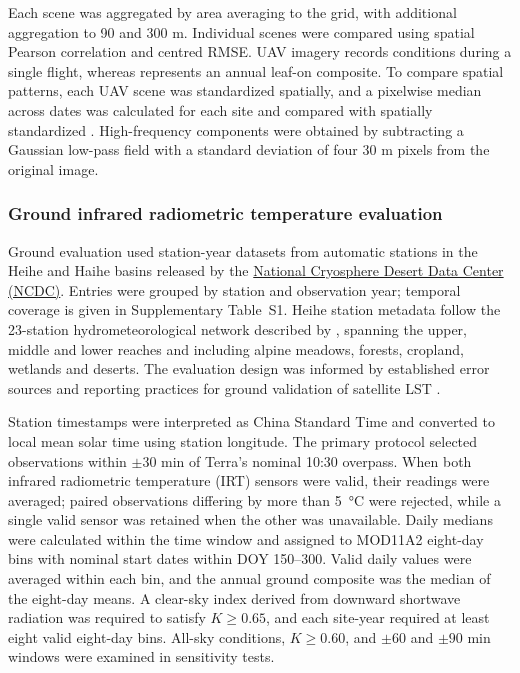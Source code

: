 Each scene was aggregated by area averaging to the \chinatherm{} grid, with additional aggregation to 90 and 300 m. Individual scenes were compared using spatial Pearson correlation and centred RMSE. UAV imagery records conditions during a single flight, whereas \chinatherm{} represents an annual leaf-on composite. To compare spatial patterns, each UAV scene was standardized spatially, and a pixelwise median across dates was calculated for each site and compared with spatially standardized \chinatherm{}. High-frequency components were obtained by subtracting a Gaussian low-pass field with a standard deviation of four 30 m pixels from the original image.

\subsubsection{Ground infrared radiometric temperature evaluation}

Ground evaluation used station-year datasets from automatic stations in the Heihe and Haihe basins released by the \href{https://www.ncdc.ac.cn/}{National Cryosphere Desert Data Center (NCDC)}. Entries were grouped by station and observation year; temporal coverage is given in Supplementary Table~S1. Heihe station metadata follow the 23-station hydrometeorological network described by \textcite{liu2018heiheNetwork}, spanning the upper, middle and lower reaches and including alpine meadows, forests, cropland, wetlands and deserts. The evaluation design was informed by established error sources and reporting practices for ground validation of satellite LST \parencite{guillevic2018protocol,zhu2021groundValidation}.

Station timestamps were interpreted as China Standard Time and converted to local mean solar time using station longitude. The primary protocol selected observations within $\pm30$ min of Terra's nominal 10:30 overpass. When both infrared radiometric temperature (IRT) sensors were valid, their readings were averaged; paired observations differing by more than 5~°C were rejected, while a single valid sensor was retained when the other was unavailable. Daily medians were calculated within the time window and assigned to MOD11A2 eight-day bins with nominal start dates within DOY 150--300. Valid daily values were averaged within each bin, and the annual ground composite was the median of the eight-day means. A clear-sky index derived from downward shortwave radiation was required to satisfy $K\geq0.65$, and each site-year required at least eight valid eight-day bins. All-sky conditions, $K\geq0.60$, and $\pm60$ and $\pm90$ min windows were examined in sensitivity tests.

